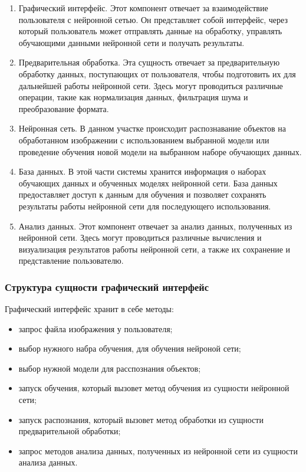 \begin{enumerate}
\item Графический интерфейс. Этот компонент отвечает за взаимодействие пользователя с нейронной сетью. Он представляет собой интерфейс, через который пользователь может отправлять данные на обработку, управлять обучающими данными нейронной сети и получать результаты.
\item Предварительная обработка. Эта сущность отвечает за предварительную обработку данных, поступающих от пользователя, чтобы подготовить их для дальнейшей работы нейронной сети. Здесь могут проводиться различные операции, такие как нормализация данных, фильтрация шума и преобразование формата.
\item Нейронная сеть. В данном участке происходит распознавание объектов на обработанном изображении с использованием выбранной модели или проведение обучения новой модели на выбранном наборе обучающих данных.
\item База данных. В этой части системы хранится информация о наборах обучающих данных и обученных моделях нейронной сети. База данных предоставляет доступ к данным для обучения и позволяет сохранять результаты работы нейронной сети для последующего использования.
\item Анализ данных. Этот компонент отвечает за анализ данных, полученных из нейронной сети. Здесь могут проводиться различные вычисления и визуализация результатов работы нейронной сети, а также их сохранение и представление пользователю.
\end{enumerate}

\subsubsection{Структура сущности графический интерфейс}
Графический интерфейс хранит в себе методы:

\begin{itemize}
\item запрос файла изображения у пользователя;
\item выбор нужного набра обучения, для обучения нейроной сети;
\item выбор нужной модели для расспознания объектов;
\item запуск обучения, который вызовет метод обучения из сущности нейронной сети;
\item запуск распознания, который вызовет метод обработки из сущности предварительной обработки;
\item запрос методов анализа данных, полученных из нейронной сети из сущности анализа данных.
\end{itemize}


